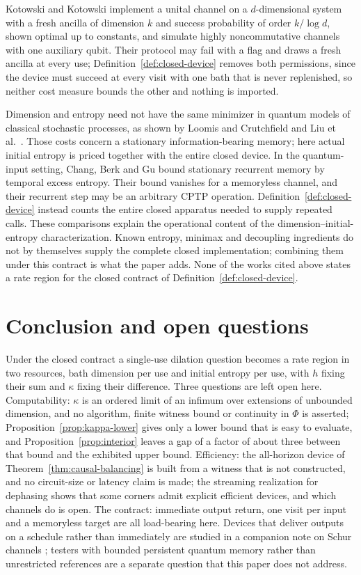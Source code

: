 \documentclass[11pt,a4paper]{article}
\numberwithin{equation}{section}
\theoremstyle{plain}
\theoremstyle{definition}
\begin{document}
Kotowski and Kotowski \cite{Kotowski2026} implement a unital channel on a
$d$-dimensional system with a fresh ancilla of dimension $k$ and success
probability of order $k/\log d$, shown optimal up to constants, and simulate
highly noncommutative channels with one auxiliary qubit. Their protocol may
fail with a flag and draws a fresh ancilla at every use;
Definition~\ref{def:closed-device} removes both permissions, since the device
must succeed at every visit with one bath that is never replenished, so
neither cost measure bounds the other and nothing is imported.

Dimension and entropy need not have the same minimizer in quantum models
of classical stochastic processes, as shown by Loomis and Crutchfield
\cite{Loomis2019} and Liu et al.\ \cite{Liu2019}. Those costs concern a stationary
information-bearing memory; here actual initial entropy is priced together
with the entire closed device. In the quantum-input setting, Chang, Berk and Gu
\cite[Theorem 3 and Appendix B.5]{Chang2026} bound stationary recurrent memory
by temporal excess entropy. Their bound vanishes for a memoryless channel,
and their recurrent step may be an arbitrary CPTP operation.
Definition~\ref{def:closed-device} instead counts the entire closed apparatus
needed to supply repeated calls. These comparisons explain the operational content of
the dimension--initial-entropy characterization. Known entropy, minimax and
decoupling ingredients do not by themselves supply the complete closed
implementation; combining them under this contract is what the paper adds.
None of the works cited above states a rate region for the closed contract of
Definition~\ref{def:closed-device}.

\section{Conclusion and open questions}
\label{sec:conclusion}

Under the closed contract a single-use dilation question becomes a rate region
in two resources, bath dimension per use and initial entropy per use, with $h$
fixing their sum and $\kappa$ fixing their difference. Three questions are left
open here. Computability: $\kappa$ is an ordered limit of an infimum over
extensions of unbounded dimension, and no algorithm, finite witness bound or
continuity in $\Phi$ is asserted; Proposition~\ref{prop:kappa-lower} gives
only a lower bound that is easy to evaluate, and Proposition~\ref{prop:interior}
leaves a gap of a factor of about three between that bound and the exhibited
upper bound. Efficiency: the all-horizon device of
Theorem~\ref{thm:causal-balancing} is built from a witness that is not
constructed, and no circuit-size or latency claim is made; the streaming
realization for dephasing shows that some corners admit explicit efficient
devices, and which channels do is open. The contract: immediate output return,
one visit per input and a memoryless target are all load-bearing here. Devices
that deliver outputs on a schedule rather than immediately are studied in a
companion note on Schur channels \cite{Douglas2026Schur}; testers with bounded
persistent quantum memory rather than unrestricted references are a separate
question that this paper does not address.
\end{document}
